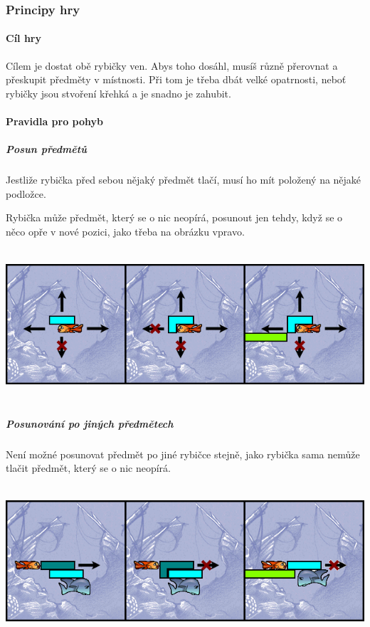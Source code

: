 \hypertarget{principy-hry}{%
\subsubsection{Principy hry}\label{principy-hry}}

\hypertarget{cuxedl-hry}{%
\paragraph{Cíl hry}\label{cuxedl-hry}}

Cílem je dostat obě rybičky ven. Abys toho dosáhl, musíš různě přerovnat
a přeskupit předměty v místnosti. Při tom je třeba dbát velké
opatrnosti, neboť rybičky jsou stvoření křehká a je snadno je zahubit.

\hypertarget{pravidla-pro-pohyb}{%
\paragraph{Pravidla pro pohyb}\label{pravidla-pro-pohyb}}

\hypertarget{posun-pux159edmux11btux16f}{%
\subparagraph{Posun předmětů}\label{posun-pux159edmux11btux16f}}

Jestliže rybička před sebou nějaký předmět tlačí, musí ho mít položený
na nějaké podložce.

Rybička může předmět, který se o nic neopírá, posunout jen tehdy, když
se o něco opře v nové pozici, jako třeba na obrázku vpravo.

\includegraphics[width=6.5625in,height=2.20833in]{pushing_objects.png}

\hypertarget{posunovuxe1nuxed-po-jinuxfdch-pux159edmux11btech}{%
\subparagraph{Posunování po jiných
předmětech}\label{posunovuxe1nuxed-po-jinuxfdch-pux159edmux11btech}}

Není možné posunovat předmět po jiné rybičce stejně, jako rybička sama
nemůže tlačit předmět, který se o nic neopírá.

\includegraphics[width=6.5625in,height=2.20833in]{pushing_along_other_objects.png}

